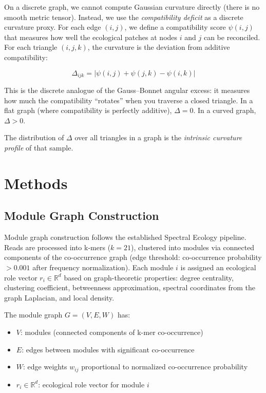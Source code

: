 \documentclass{../yalumba}
\begin{document}
On a discrete graph, we cannot compute Gaussian curvature directly (there
is no smooth metric tensor).  Instead, we use the \emph{compatibility
deficit} as a discrete curvature proxy.  For each edge $(i,j)$, we define
a compatibility score $\psi(i,j)$ that measures how well the ecological
patches at nodes $i$ and $j$ can be reconciled.  For each triangle
$(i,j,k)$, the curvature is the deviation from additive compatibility:

\begin{equation}
  \Delta_{ijk} = |\psi(i,j) + \psi(j,k) - \psi(i,k)|
  \label{eq:discrete-curvature-intro}
\end{equation}

This is the discrete analogue of the Gauss--Bonnet angular excess: it
measures how much the compatibility ``rotates'' when you traverse a closed
triangle.  In a flat graph (where compatibility is perfectly additive),
$\Delta = 0$.  In a curved graph, $\Delta > 0$.


The distribution of $\Delta$ over all triangles in a graph is the
\emph{intrinsic curvature profile} of that sample.


\section{Methods}
\label{sec:methods}

\subsection{Module Graph Construction}

Module graph construction follows the established Spectral Ecology pipeline.
Reads are processed into k-mers ($k = 21$), clustered into modules via
connected components of the co-occurrence graph (edge threshold:
co-occurrence probability $> 0.001$ after frequency normalization).  Each
module $i$ is assigned an ecological role vector $r_i \in \mathbb{R}^d$
based on graph-theoretic properties: degree centrality, clustering
coefficient, betweenness approximation, spectral coordinates from the graph
Laplacian, and local density.

The module graph $G = (V, E, W)$ has:
\begin{itemize}
  \item $V$: modules (connected components of k-mer co-occurrence)
  \item $E$: edges between modules with significant co-occurrence
  \item $W$: edge weights $w_{ij}$ proportional to normalized co-occurrence
    probability
  \item $r_i \in \mathbb{R}^d$: ecological role vector for module $i$
\end{itemize}
\end{document}
